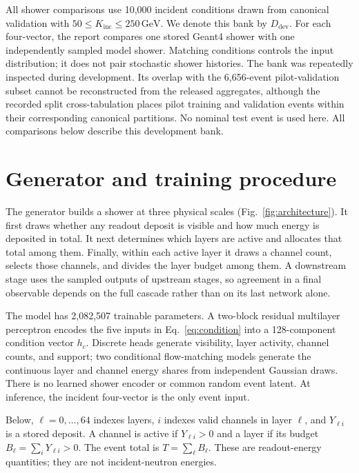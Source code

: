 \documentclass[11pt]{article}
\newcommand{\GeV}{\,\mathrm{GeV}}
\newcommand{\Kinc}{K_{\mathrm{inc}}}
\newcommand{\Ddev}{D_{\mathrm{dev}}}
\begin{document}
All shower comparisons use 10,000 incident conditions drawn from canonical validation with $50\leq\Kinc\leq250\GeV$. We denote this bank by $\Ddev$. For each four-vector, the report compares one stored Geant4 shower with one independently sampled model shower. Matching conditions controls the input distribution; it does not pair stochastic shower histories. The bank was repeatedly inspected during development. Its overlap with the 6,656-event pilot-validation subset cannot be reconstructed from the released aggregates, although the recorded split cross-tabulation places pilot training and validation events within their corresponding canonical partitions. No nominal test event is used here. All comparisons below describe this development bank.

\section{Generator and training procedure}
\label{sec:model}

The generator builds a shower at three physical scales (Fig.~\ref{fig:architecture}). It first draws whether any readout deposit is visible and how much energy is deposited in total. It next determines which layers are active and allocates that total among them. Finally, within each active layer it draws a channel count, selects those channels, and divides the layer budget among them. A downstream stage uses the sampled outputs of upstream stages, so agreement in a final observable depends on the full cascade rather than on its last network alone.

The model has 2,082,507 trainable parameters. A two-block residual multilayer perceptron encodes the five inputs in Eq.~\eqref{eq:condition} into a 128-component condition vector $h_c$. Discrete heads generate visibility, layer activity, channel counts, and support; two conditional flow-matching models generate the continuous layer and channel energy shares from independent Gaussian draws. There is no learned shower encoder or common random event latent. At inference, the incident four-vector is the only event input.

Below, $\ell=0,\ldots,64$ indexes layers, $i$ indexes valid channels in layer $\ell$, and $Y_{\ell i}$ is a stored deposit. A channel is active if $Y_{\ell i}>0$ and a layer if its budget $B_\ell=\sum_iY_{\ell i}>0$. The event total is $T=\sum_\ell B_\ell$. These are readout-energy quantities; they are not incident-neutron energies.
\end{document}
